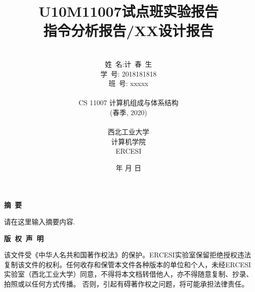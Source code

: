 \documentclass[UTF8]{article}
\begin{document}
\renewcommand{\contentsname}{目\ 录}
\renewcommand{\appendixname}{附录}
\renewcommand{\refname}{参考文献} 
\renewcommand{\figurename}{图}
\renewcommand{\tablename}{表}
\renewcommand{\today}{\number\year 年 \number\month 月 \number\day 日}

\title{{\Huge U10M11007试点班实验报告{\large\linebreak\\}}{\Large 指令分析报告/XX设计报告\linebreak\linebreak}}
\author{\\姓\ 名:计\ 春\ 生\\
学\ 号: 2018181818\\
班\ 号: xxxxx\\\\
CS 11007 计算机组成与体系结构\\
(春季, 2020)\\\\
西北工业大学\\
计算机学院\\
ERCESI}
\date{\today}
\maketitle
\newpage

\begin{center}
{\Large\bf{摘\ 要\\}}
\end{center}
请在这里输入摘要内容.
\newpage
\begin{center}
{\Large\bf{版\ 权\ 声\ 明\\}}
\end{center}
该文件受《中华人名共和国著作权法》的保护。ERCESI实验室保留拒绝授权违法复制该文件的权利。任何收存和保管本文件各种版本的单位和个人，未经ERCESI实验室（西北工业大学）同意，不得将本文档转借他人，亦不得随意复制、抄录、拍照或以任何方式传播。 否则，引起有碍著作权之问题，将可能承担法律责任。\newpage
\begin{center}
\tableofcontents\label{c}
\end{center}
\newpage

\end{document}
